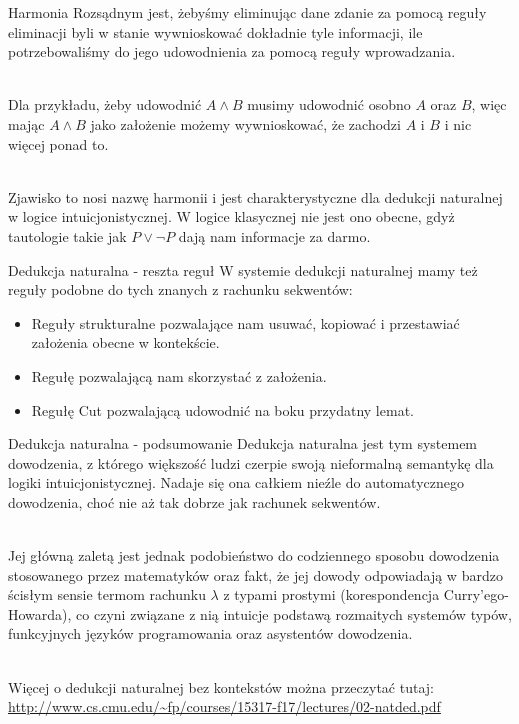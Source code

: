 \documentclass{beamer}
\begin{document}
\begin{frame}{Harmonia}
	Rozsądnym jest, żebyśmy eliminując dane zdanie za pomocą reguły eliminacji byli w stanie wywnioskować dokładnie tyle informacji, ile potrzebowaliśmy do jego udowodnienia za pomocą reguły wprowadzania. \\~\
	
	Dla przykładu, żeby udowodnić $A \land B$ musimy udowodnić osobno $A$ oraz $B$, więc mając $A \land B$ jako założenie możemy wywnioskować, że zachodzi $A$ i $B$ i nic więcej ponad to. \\~\
	
	Zjawisko to nosi nazwę harmonii i jest charakterystyczne dla dedukcji naturalnej w logice intuicjonistycznej. W logice klasycznej nie jest ono obecne, gdyż tautologie takie jak $P \lor \neg P$ dają nam informacje za darmo.
\end{frame}

\begin{frame}{Dedukcja naturalna - reszta reguł}
	W systemie dedukcji naturalnej mamy też reguły podobne do tych znanych z rachunku sekwentów:
	\begin{itemize}
		\item Reguły strukturalne pozwalające nam usuwać, kopiować i przestawiać założenia obecne w kontekście.
		\item Regułę pozwalającą nam skorzystać z założenia.
		\item Regułę Cut pozwalającą udowodnić na boku przydatny lemat.
	\end{itemize}

\end{frame}

\begin{frame}{Dedukcja naturalna - podsumowanie}
	Dedukcja naturalna jest tym systemem dowodzenia, z którego większość ludzi czerpie swoją nieformalną semantykę dla logiki intuicjonistycznej. Nadaje się ona całkiem nieźle do automatycznego dowodzenia, choć nie aż tak dobrze jak rachunek sekwentów. \\~\
	
	Jej główną zaletą jest jednak podobieństwo do codziennego sposobu dowodzenia stosowanego przez matematyków oraz fakt, że jej dowody odpowiadają w bardzo ścisłym sensie termom rachunku $\lambda$ z typami prostymi (korespondencja Curry'ego-Howarda), co czyni związane z nią intuicje podstawą rozmaitych systemów typów, funkcyjnych języków programowania oraz asystentów dowodzenia. \\~\
	
	Więcej o dedukcji naturalnej bez kontekstów można przeczytać tutaj: \url{http://www.cs.cmu.edu/~fp/courses/15317-f17/lectures/02-natded.pdf}
\end{frame}
\end{document}

